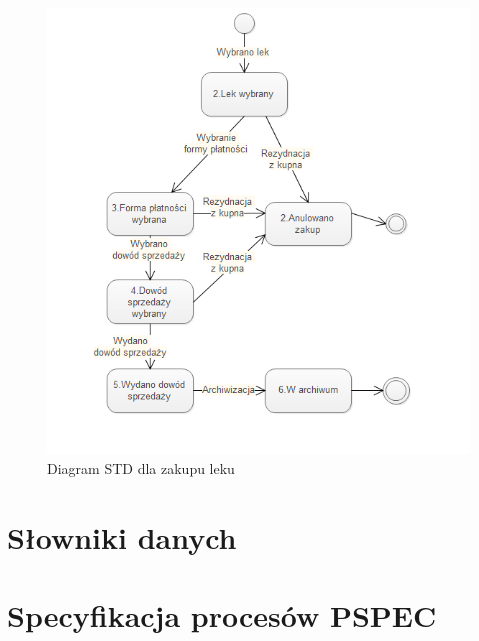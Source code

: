 \documentclass[a4paper, 11pt]{article}
\begin{document}
	\begin{figure}[H]
\centerline{\includegraphics[scale=1]{STDzakup.png}}
\caption{Diagram STD dla zakupu leku}
\end{figure}
	\section{Słowniki danych}
	
	\section{Specyfikacja procesów PSPEC}
\end{document}
